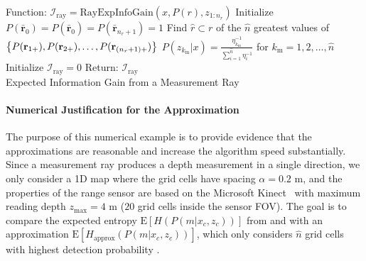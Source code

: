 \vspace*{0.05\columnwidth}
\begin{algorithm}[H]
	Function: $\mathcal I_\text{ray}=\text{RayExpInfoGain}(x,P(r),z_{1:n_{r}})$\;
	Initialize $P(\bar{\mathbf{r}}_{0})=P(\hat{\bar{\mathbf{r}}}_{0})=P(\bar{\mathbf{r}}_{n_{r}+1})=1$\;
	Find $\hat r\subset r$ of the $\hat n$ greatest values of 
	$\left\{ P(\mathbf{r}_{1+}),P(\mathbf{r}_{2+}),\ldots,P(\mathbf{r}_{(n_{r}+1)+}) \right\}$\;
	$P(z_{k_\text{m}}|x)=\frac{\eta^{-1}_{k_\text{m}}}{\sum_{i=1}^{\hat n}\eta^{-1}_{i}}$ for $k_\text{m}=1,2,\ldots,\hat n$\;
	Initialize $\mathcal I_\text{ray}=0$\;
	Return: $\mathcal I_\text{ray}$\\
\caption{Expected Information Gain from a Measurement Ray}
\label{alg:RayExpectedEntropyGain}
\end{algorithm}



\paragraph{Numerical Justification for the Approximation}

The purpose of this numerical example is to provide evidence that the approximations are reasonable and increase the algorithm speed substantially.
Since a measurement ray produces a depth measurement in a single direction, we only consider a 1D map where the grid cells have spacing $\alpha=0.2$ m, and the properties of the range sensor are based on the Microsoft Kinect~\cite{PirRutBisSch11,KhoElb12} with maximum reading depth $z_\text{max}=4$ m ($20$ grid cells inside the sensor FOV). The goal is to compare the expected entropy $\text{E}[H(P(m|x_c,z_{c}))]$ from  and with an approximation $\text{E}[H_\text{approx}(P(m|x_c,z_{c}))]$, which only considers $\hat n$ grid cells with highest detection probability .

